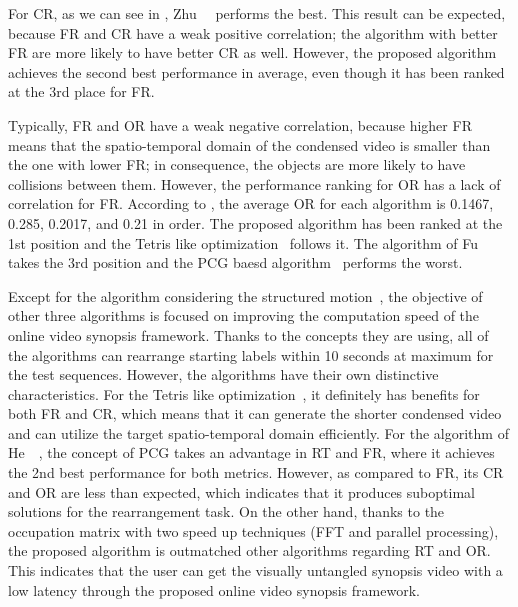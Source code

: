 \documentclass[11pt]{hyu_thesis}
\begin{document}
For CR, as we can see in , Zhu~\etal~\cite{Zhu2015} performs the best. This result can be expected, because FR and CR have a weak positive correlation; the algorithm with better FR are more likely to have better CR as well. However, the proposed algorithm achieves the second best performance in average, even though it has been ranked at the 3rd place for FR.

Typically, FR and OR have a weak negative correlation, because higher FR means that the spatio-temporal domain of the condensed video is smaller than the one with lower FR; in consequence, the objects are more likely to have collisions between them. However, the performance ranking for OR has a lack of correlation for FR. According to , the average OR for each algorithm is 0.1467, 0.285, 0.2017, and 0.21 in order. The proposed algorithm has been ranked at the 1st position and the Tetris like optimization~\cite{Zhu2015} follows it. The algorithm of Fu~\etal~\cite{Fu2014} takes the 3rd position and the PCG baesd algorithm~\cite{He2017} performs the worst.

Except for the algorithm considering the structured motion~\cite{Fu2014}, the objective of other three algorithms is focused on improving the computation speed of the online video synopsis framework. Thanks to the concepts they are using, all of the algorithms can rearrange starting labels within 10 seconds at maximum for the test sequences. However, the algorithms have their own distinctive characteristics. For the Tetris like optimization~\cite{Zhu2015}, it definitely has benefits for both FR and CR, which means that it can generate the shorter condensed video and can utilize the target spatio-temporal domain efficiently. For the algorithm of He~\etal~\cite{He2017}, the concept of PCG takes an advantage in RT and FR, where it achieves the 2nd best performance for both metrics. However, as compared to FR, its CR and OR are less than expected, which indicates that it produces suboptimal solutions for the rearrangement task. On the other hand, thanks to the occupation matrix with two speed up techniques (FFT and parallel processing), the proposed algorithm is outmatched other algorithms regarding RT and OR. This indicates that the user can get the visually untangled synopsis video with a low latency through the proposed online video synopsis framework.

\tableVCOne
{}\tableVCTwo
{}\tableVCThree
{}\tableVCFour
{}\tableVCFive
{}\tableVCSix
\end{document}
